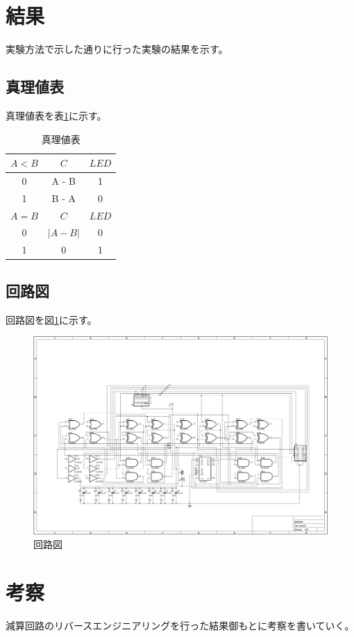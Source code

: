 \documentclass[a4paper,11pt]{ltjsarticle}
\begin{document}
\section{結果}
実験方法で示した通りに行った実験の結果を示す。
\subsection{真理値表}
真理値表を表\ref{tab:truth}に示す。
\begin{table}[htbp]
    \centering
    \caption{真理値表}
    \begin{tabular}{c|c|c}
        \hline
        $A < B$ & $C$ & $LED$ \\
        \hline
        0 & A - B & 1 \\
        1 & B - A & 0 \\
        \hline
        \hline
        $A = B$ & $C$ & $LED$ \\
        \hline
        0 & $|A - B|$ & 0 \\
        1 & 0 & 1 \\
        \hline
    \end{tabular}
    \label{tab:truth}
\end{table}
\subsection{回路図}
回路図を図\ref{fig:circ}に示す。
\begin{figure}[H]
    \centering
    \includegraphics[angle=90,width=\columnwidth]{./image/genzan.png}
    \caption{回路図}
    \label{fig:circ}
\end{figure}
\section{考察}
減算回路のリバースエンジニアリングを行った結果御もとに考察を書いていく。
\end{document}
